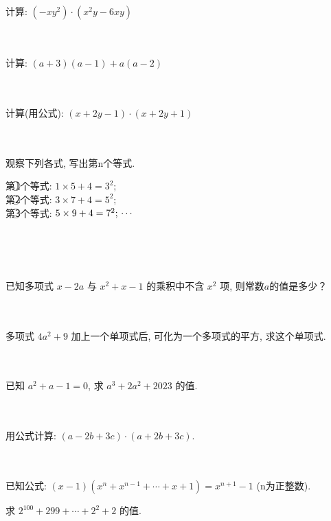\item{
    计算: $(-xy^2)\cdot (x^2y - 6xy)$
}
\\ \\ \\

\item{
    计算: $(a+3)(a-1) + a(a-2)$
}
\\ \\ \\

\item{
    计算(用公式): $(x+2y-1)\cdot (x+2y+1)$
}
\\ \\ \\

\item{
    观察下列各式, 写出第n个等式.

    第\textcircled{1}个等式: $1\times 5 + 4 = 3^2;$ \\
    第\textcircled{2}个等式: $3\times 7 + 4 = 5^2;$ \\
    第\textcircled{3}个等式: $5\times 9 + 4 = 7^2; \\ \cdots $ \\
}
\\ \\ \\

\item{
    已知多项式 $x-2a$ 与 $x^2+x-1$ 的乘积中不含 $x^2$ 项, 则常数$a$的值是多少？
}
\\ \\ \\

\item{
    多项式 $4a^2+9$ 加上一个单项式后, 可化为一个多项式的平方, 求这个单项式.
}
\\ \\ \\

\item{
    已知 $a^2+a-1=0$, 求 $a^3 + 2a^2 + 2023$ 的值.
}
\\ \\ \\

\item{
    用公式计算: $(a-2b+3c)\cdot (a+2b+3c)$.
}
\\ \\ \\

\item{
    已知公式: $(x-1)(x^n + x^{n-1} + \cdots + x + 1) = x^{n+1} - 1$ (n为正整数).
    
    求 $2^{100} + 2{99} +\cdots + 2^2 + 2$ 的值.
}
\\ \\ \\
